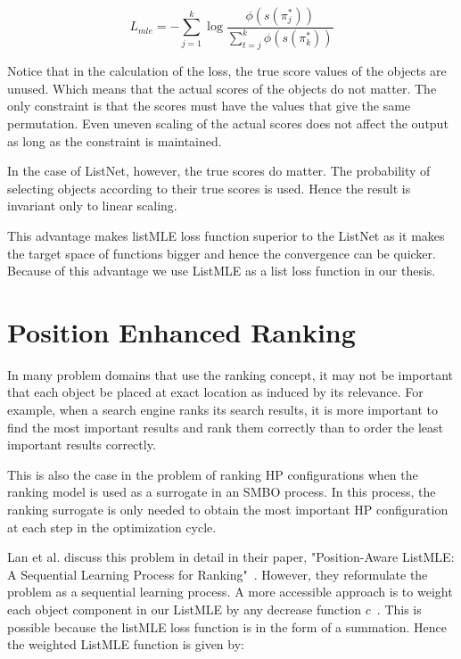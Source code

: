 \documentclass[12pt, twoside, ngerman]{report}
\begin{document}
\begin{equation}
L_{mle} = -  \sum\limits_{j=1}^{k} \log \frac{\phi(s(\pi^*_j))}{ \sum\limits_{t=j}^k \phi(s(\pi^*_k))}
\end{equation}


Notice that in the calculation of the loss, the true score values of the objects are unused.
Which means that the actual scores of the objects do not matter.
The only constraint is that the scores must have the values that give the same permutation.
Even uneven scaling of the actual scores does not affect the output as long as the constraint is maintained.

In the case of ListNet,  however,  the true scores do matter.
The probability of selecting objects according to their true scores is used.
Hence the result is invariant only to linear scaling.

This advantage makes listMLE loss function superior to the ListNet as it makes the target space of functions bigger and hence the convergence can be quicker.
Because of this advantage we use ListMLE as a list loss function in our thesis.

\section{Position Enhanced Ranking}\label{sec:positionEnhancedRanking}

In many problem domains that use the ranking concept,  it may not be important that each object be placed at exact location as induced by its relevance.
For example,  when a search engine ranks its search results, it is more important to find the most important results and rank them correctly than to order the least important results correctly.

This is also the case in the problem of ranking HP configurations when the ranking model is used as a surrogate in an SMBO process.
In this process,  the ranking surrogate is only needed to obtain the most important HP configuration at each step in the optimization cycle.

Lan et al.  discuss this problem in detail in their paper,  "Position-Aware ListMLE: A Sequential Learning Process for Ranking"~\cite{positionawarerankinglistmle}.
However,  they reformulate the problem as a sequential learning process.
A more accessible approach is to weight each object component in our ListMLE by any decrease function $c$~\cite{TRLWO}.
This is possible because the listMLE loss function is in the form of a summation.
Hence the weighted ListMLE function is given by:
\end{document}
